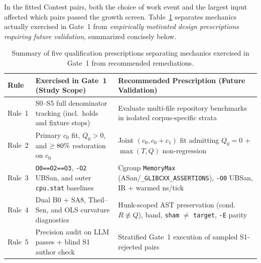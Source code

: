 \documentclass[11pt]{article}
\begin{document}
In the fitted Contest pairs, both the choice of work event and the largest input affected which pairs passed the growth screen. Table~\ref{tab:rules} separates mechanics actually exercised in Gate~1 from \emph{empirically motivated design prescriptions requiring future validation}, summarized concisely below.

\begin{table}[htbp]
\caption{Summary of five qualification prescriptions separating mechanics exercised in Gate~1 from recommended remediations.}
\label{tab:rules}
\centering
\scriptsize
\setlength{\tabcolsep}{3.0pt}
\begin{tabularx}{\linewidth}{@{}lXX@{}}
\toprule
Rule & Exercised in Gate~1 (Study Scope) & Recommended Prescription (Future Validation) \\
\midrule
Rule~1 & S0--S5 full denominator tracking (incl.\ holds and fixture stops) & Evaluate multi-file repository benchmarks in isolated corpus-specific strata \\
Rule~2 & Primary $c_0$ fit, $Q_0>0$, and $\ge 80\%{}$ restoration on $c_0$ & Joint $(c_0, c_0+c_1)$ fit admitting $Q_0=0$ + $\max(T,Q)$ non-regression \\
Rule~3 & \texttt{O0==O2==O3}, \texttt{-O2} UBSan, and outer \texttt{cpu.stat} baselines & Cgroup \texttt{MemoryMax} (ASan/\texttt{\_GLIBCXX\_ASSERTIONS}), \texttt{-O0} UBSan, IR + warmed ns/tick \\
Rule~4 & Dual B0 + SA8, Theil--Sen, and OLS curvature diagnostics & Hunk-scoped AST preservation (cond.\ $R \not\equiv Q$), \BenchRestTwoSidedBand{} band, \texttt{sham} $\neq$ \texttt{target}, \texttt{-E} parity \\
Rule~5 & Precision audit on LLM passes + blind S1 author check & Stratified Gate~1 execution of sampled S1-rejected pairs \\
\bottomrule
\end{tabularx}
\end{table}
\end{document}
